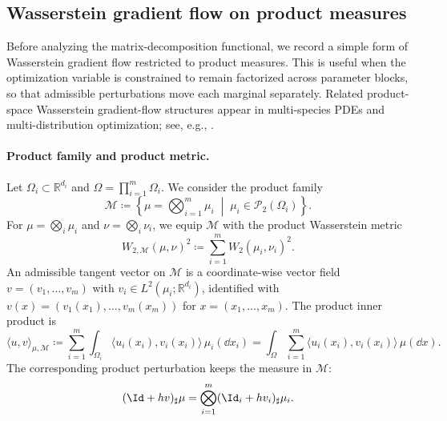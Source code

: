 \subsection{Wasserstein gradient flow on product measures}
\label{app:product-measure-wgf}

Before analyzing the matrix-decomposition functional, we record a simple form of
Wasserstein gradient flow restricted to product measures.  This is useful when the
optimization variable is constrained to remain factorized across parameter blocks,
so that admissible perturbations move each marginal separately.
Related product-space Wasserstein gradient-flow structures appear in multi-species
PDEs and multi-distribution optimization; see, e.g.,
\citet{chen2016wassersteinProduct,giunta2024weaklynonlinear,conger2025coupled}.

\paragraph{Product family and product metric.}
Let $\Omega_i\subset\mathbb R^{d_i}$ and $\Omega=\prod_{i=1}^m\Omega_i$.  We consider the
product family
\begin{equation}
    \mathcal M
    \coloneqq
    \left\{
        \mu=\bigotimes_{i=1}^m\mu_i
        \;\middle|\;
        \mu_i\in\mathcal P_2(\Omega_i)
    \right\}.
\end{equation}
For $\mu=\bigotimes_i\mu_i$ and $\nu=\bigotimes_i\nu_i$, we equip $\mathcal M$ with the
product Wasserstein metric
\begin{equation}
    \label{eq:product-Wasserstein-metric}
    W_{2,\mathcal M}(\mu,\nu)^2
    \coloneqq
    \sum_{i=1}^m W_2(\mu_i,\nu_i)^2 .
\end{equation}
An admissible tangent vector on $\mathcal M$ is a coordinate-wise vector field
$v=(v_1,\ldots,v_m)$ with $v_i\in L^2(\mu_i;\mathbb R^{d_i})$, identified with
$v(x)=(v_1(x_1),\ldots,v_m(x_m))$ for $x=(x_1,\ldots,x_m)$.  The product inner product is
\begin{equation}
    \langle u,v\rangle_{\mu,\mathcal M}
    \coloneqq
    \sum_{i=1}^m \int_{\Omega_i} \langle u_i(x_i),v_i(x_i)\rangle\,\mu_i(\dd x_i)
    =
    \int_{\Omega}\sum_{i=1}^m \langle u_i(x_i),v_i(x_i)\rangle\,\mu(\dd x).
\end{equation}
The corresponding product perturbation keeps the measure in $\mathcal M$:
\begin{equation}
    (\Id+h v)_\sharp\mu
    =
    \bigotimes_{i=1}^m (\Id_i+h v_i)_\sharp\mu_i .
\end{equation}

